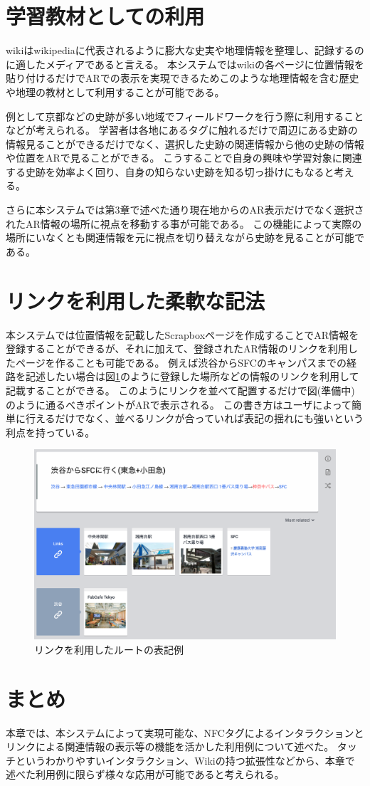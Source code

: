 \section{学習教材としての利用}
wikiはwikipediaに代表されるように膨大な史実や地理情報を整理し、記録するのに適したメディアであると言える。
本システムではwikiの各ページに位置情報を貼り付けるだけでARでの表示を実現できるためこのような地理情報を含む歴史や地理の教材として利用することが可能である。

例として京都などの史跡が多い地域でフィールドワークを行う際に利用することなどが考えられる。
学習者は各地にあるタグに触れるだけで周辺にある史跡の情報見ることができるだけでなく、選択した史跡の関連情報から他の史跡の情報や位置をARで見ることができる。
こうすることで自身の興味や学習対象に関連する史跡を効率よく回り、自身の知らない史跡を知る切っ掛けにもなると考える。

さらに本システムでは第3章で述べた通り現在地からのAR表示だけでなく選択されたAR情報の場所に視点を移動する事が可能である。
この機能によって実際の場所にいなくとも関連情報を元に視点を切り替えながら史跡を見ることが可能である。

\section{リンクを利用した柔軟な記法}
\label{link_enum_notation}
本システムでは位置情報を記載したScrapboxページを作成することでAR情報を登録することができるが、それに加えて、登録されたAR情報のリンクを利用したページを作ることも可能である。
例えば渋谷からSFCのキャンパスまでの経路を記述したい場合は図\ref{fig:route_scrapbox}のように登録した場所などの情報のリンクを利用して記載することができる。
このようにリンクを並べて配置するだけで図(準備中)のように通るべきポイントがARで表示される。
この書き方はユーザによって簡単に行えるだけでなく、並べるリンクが合っていれば表記の揺れにも強いという利点を持っている。

\begin{figure}[h]
  \centering
  \includegraphics[width=150mm]{images/route_scrapbox.png}
  \caption{リンクを利用したルートの表記例} \label{fig:route_scrapbox}
\end{figure}


\section{まとめ}
本章では、本システムによって実現可能な、NFCタグによるインタラクションとリンクによる関連情報の表示等の機能を活かした利用例について述べた。
タッチというわかりやすいインタラクション、Wikiの持つ拡張性などから、本章で述べた利用例に限らず様々な応用が可能であると考えられる。